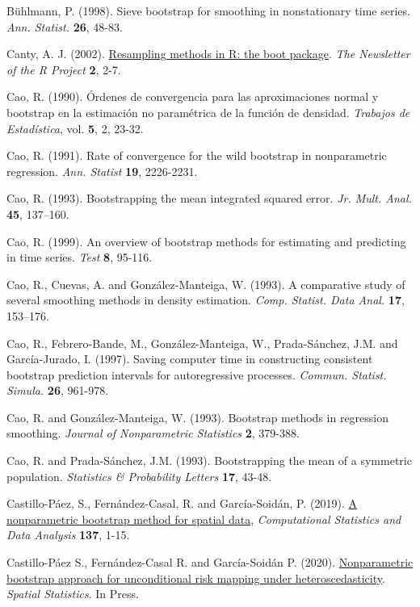 \documentclass[]{book}
\theoremstyle{break}
\theoremstyle{definition}
\theoremstyle{definition}
\theoremstyle{definition}
\theoremstyle{remark}
\begin{document}
Bühlmann, P. (1998). Sieve bootstrap for smoothing in nonstationary time
series. \emph{Ann. Statist.} \textbf{26}, 48-83.

Canty, A. J. (2002).
\href{http://cran.fhcrc.org/doc/Rnews/Rnews_2002-3.pdf}{Resampling
methods in R: the boot package}. \emph{The Newsletter of the R Project}
\textbf{2}, 2-7.

Cao, R. (1990). Órdenes de convergencia para las aproximaciones normal y
bootstrap en la estimación no paramétrica de la función de densidad.
\emph{Trabajos de Estadística}, vol. \textbf{5}, 2, 23-32.

Cao, R. (1991). Rate of convergence for the wild bootstrap in
nonparametric regression. \emph{Ann. Statist} \textbf{19}, 2226-2231.

Cao, R. (1993). Bootstrapping the mean integrated squared error.
\emph{Jr. Mult. Anal.} \textbf{45}, 137--160.

Cao, R. (1999). An overview of bootstrap methods for estimating and
predicting in time series. \emph{Test} \textbf{8}, 95-116.

Cao, R., Cuevas, A. and González-Manteiga, W. (1993). A comparative
study of several smoothing methods in density estimation. \emph{Comp.
Statist. Data Anal.} \textbf{17}, 153--176.

Cao, R., Febrero-Bande, M., González-Manteiga, W., Prada-Sánchez, J.M.
and García-Jurado, I. (1997). Saving computer time in constructing
consistent bootstrap prediction intervals for autoregressive processes.
\emph{Commun. Statist. Simula.} \textbf{26}, 961-978.

Cao, R. and González-Manteiga, W. (1993). Bootstrap methods in
regression smoothing. \emph{Journal of Nonparametric Statistics}
\textbf{2}, 379-388.

Cao, R. and Prada-Sánchez, J.M. (1993). Bootstrapping the mean of a
symmetric population. \emph{Statistics \& Probability Letters}
\textbf{17}, 43-48.

Castillo-Páez, S., Fernández-Casal, R. and García-Soidán, P. (2019).
\href{https://www.sciencedirect.com/science/article/pii/S0167947319300325?via\%3Dihub}{A
nonparametric bootstrap method for spatial data}, \emph{Computational
Statistics and Data Analysis} \textbf{137}, 1-15.

Castillo-Páez S., Fernández-Casal R. and García-Soidán P. (2020).
\href{https://doi.org/10.1016/j.spasta.2019.100389}{Nonparametric
bootstrap approach for unconditional risk mapping under
heteroscedasticity}. \emph{Spatial Statistics}. In Press.
\end{document}
